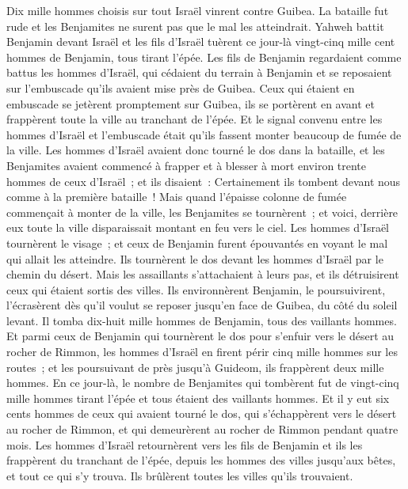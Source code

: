 \begin{multicols}{2}
Dix mille hommes choisis sur tout Israël vinrent contre Guibea. La bataille fut rude et les Benjamites ne surent pas que le mal les atteindrait.
Yahweh battit Benjamin devant Israël et les fils d'Israël tuèrent ce jour-là vingt-cinq mille cent hommes de Benjamin, tous tirant l'épée.
Les fils de Benjamin regardaient comme battus les hommes d'Israël, qui cédaient du terrain à Benjamin et se reposaient sur l'embuscade qu'ils avaient mise près de Guibea.
Ceux qui étaient en embuscade se jetèrent promptement sur Guibea, ils se portèrent en avant et frappèrent toute la ville au tranchant de l'épée.
Et le signal convenu entre les hommes d'Israël et l'embuscade était qu'ils fassent monter beaucoup de fumée de la ville.
Les hommes d'Israël avaient donc tourné le dos dans la bataille, et les Benjamites avaient commencé à frapper et à blesser à mort environ trente hommes de ceux d'Israël~; et ils disaient~: Certainement ils tombent devant nous comme à la première bataille~!
Mais quand l'épaisse colonne de fumée commençait à monter de la ville, les Benjamites se tournèrent~; et voici, derrière eux toute la ville disparaissait montant en feu vers le ciel.
Les hommes d'Israël tournèrent le visage~; et ceux de Benjamin furent épouvantés en voyant le mal qui allait les atteindre.
Ils tournèrent le dos devant les hommes d'Israël par le chemin du désert. Mais les assaillants s'attachaient à leurs pas, et ils détruisirent ceux qui étaient sortis des villes.
Ils environnèrent Benjamin, le poursuivirent, l'écrasèrent dès qu'il voulut se reposer jusqu'en face de Guibea, du côté du soleil levant.
Il tomba dix-huit mille hommes de Benjamin, tous des vaillants hommes.
Et parmi ceux de Benjamin qui tournèrent le dos pour s'enfuir vers le désert au rocher de Rimmon, les hommes d'Israël en firent périr cinq mille hommes sur les routes~; et les poursuivant de près jusqu'à Guideom, ils frappèrent deux mille hommes.
En ce jour-là, le nombre de Benjamites qui tombèrent fut de vingt-cinq mille hommes tirant l'épée et tous étaient des vaillants hommes.
Et il y eut six cents hommes de ceux qui avaient tourné le dos, qui s'échappèrent vers le désert au rocher de Rimmon, et qui demeurèrent au rocher de Rimmon pendant quatre mois.
Les hommes d'Israël retournèrent vers les fils de Benjamin et ils les frappèrent du tranchant de l'épée, depuis les hommes des villes jusqu'aux bêtes, et tout ce qui s'y trouva. Ils brûlèrent toutes les villes qu'ils trouvaient.

\end{multicols}
